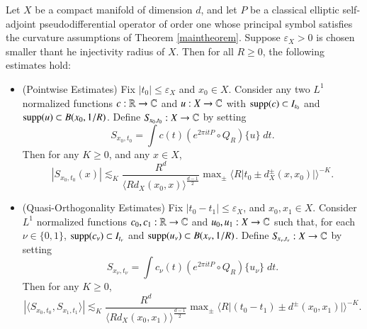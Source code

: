 \begin{prop} \label{theMainEstimatesForWave}
    Let $X$ be a compact manifold of dimension $d$, and let $P$ be a classical elliptic self-adjoint pseudodifferential operator of order one whose principal symbol satisfies the curvature assumptions of Theorem \ref{maintheorem}. Suppose $\varepsilon_X > 0$ is chosen smaller thant he injectivity radius of $X$. Then for all $R \geq 0$, the following estimates hold:
    \begin{itemize}%
        \item (Pointwise Estimates) Fix  $|t_0| \leq \varepsilon_X$ and $x_0 \in X$. Consider any two $L^1$ normalized functions $c: \operatorname{\mathbb{R}} \to \operatorname{\mathbb{C}}$ and $u: X \to \operatorname{\mathbb{C}}$ with $\operatorname{\text{supp}}(c) \subset I_{t_0}$ and $\operatorname{\text{supp}}(u) \subset B(x_0,1/R)$. Define $S\!_{x_0,t_0}: X \to \operatorname{\mathbb{C}}$ by setting
        \[ S\!_{x_0,t_0} = \int c(t) (e^{2 \pi i t P} \circ Q_R) \{ u \}\; dt. \]
        Then for any $K \geq 0$, and any $x \in X$,
        \[ |S\!_{x_0,t_0}(x)| \lesssim_K \frac{R^d}{\langle R d_X(x_0,x) \rangle^{\frac{d-1}{2}}} \max\nolimits_{\pm} \Big\langle R \big| t_0 \pm d_X^\pm(x,x_0) \big| \Big\rangle^{-K}. \]

        \item (Quasi-Orthogonality Estimates) Fix $|t_0 - t_1| \leq \varepsilon_X$, and $x_0, x_1 \in X$. Consider $L^1$ normalized functions $c_0,c_1: \operatorname{\mathbb{R}} \to \operatorname{\mathbb{C}}$ and $u_0,u_1: X \to \operatorname{\mathbb{C}}$ such that, for each $\nu \in \{ 0, 1 \}$, $\operatorname{\text{supp}}(c_\nu) \subset I_{t_\nu}$ and $\operatorname{\text{supp}}(u_\nu) \subset B(x_\nu,1/R)$. Define $S\!_{x_\nu,t_\nu}: X \to \operatorname{\mathbb{C}}$ by setting
        \[ S\!_{x_\nu,t_\nu} = \int c_\nu(t) (e^{2 \pi i t P} \circ Q_R) \{ u_\nu \}\; dt. \]
        Then for any $K \geq 0$,
        \[ \left| \langle S\!_{x_0,t_0}, S\!_{x_1,t_1} \rangle \right| \lesssim_K \frac{R^d}{\langle R d_X(x_0,x_1) \rangle^{\frac{d-1}{2}}} \max\nolimits_{\pm} \Big\langle R \big| (t_0 - t_1) \pm d^\pm(x_0,x_1) \big| \Big\rangle^{-K}. \]
    \end{itemize}
\end{prop}

%

